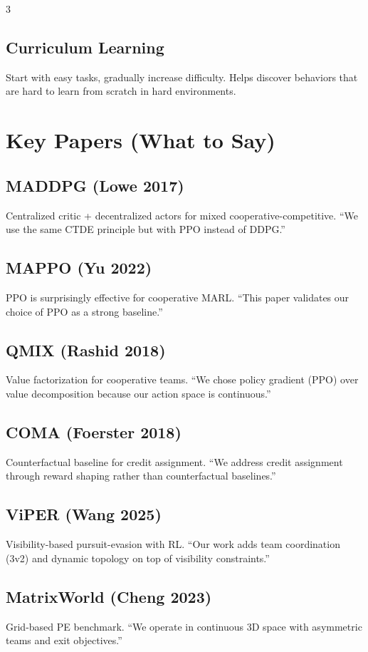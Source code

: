 \documentclass[10pt,landscape,a4paper]{article}
\begin{document}
\begin{multicols}{3}
\subsection{Curriculum Learning}
Start with easy tasks, gradually increase difficulty. Helps discover behaviors that are hard to learn from scratch in hard environments.

\section{Key Papers (What to Say)}

\subsection{MADDPG (Lowe 2017)}
Centralized critic + decentralized actors for mixed cooperative-competitive. ``We use the same CTDE principle but with PPO instead of DDPG.''

\subsection{MAPPO (Yu 2022)}
PPO is surprisingly effective for cooperative MARL. ``This paper validates our choice of PPO as a strong baseline.''

\subsection{QMIX (Rashid 2018)}
Value factorization for cooperative teams. ``We chose policy gradient (PPO) over value decomposition because our action space is continuous.''

\subsection{COMA (Foerster 2018)}
Counterfactual baseline for credit assignment. ``We address credit assignment through reward shaping rather than counterfactual baselines.''

\subsection{ViPER (Wang 2025)}
Visibility-based pursuit-evasion with RL. ``Our work adds team coordination (3v2) and dynamic topology on top of visibility constraints.''

\subsection{MatrixWorld (Cheng 2023)}
Grid-based PE benchmark. ``We operate in continuous 3D space with asymmetric teams and exit objectives.''


\end{multicols}
\end{document}
